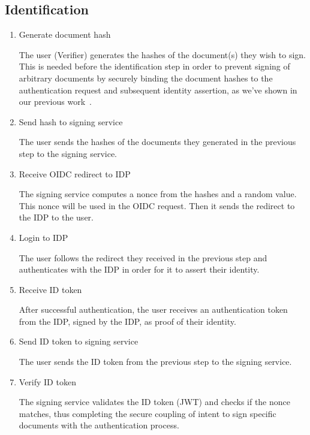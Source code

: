 \subsection{Identification}
\begin{enumerate}[resume]
	\item Generate document hash
	
	The user (Verifier) generates the hashes of the document(s) they wish to sign.
	This is needed before the identification step in order to prevent signing of arbitrary documents by securely binding the document hashes to the authentication request and subsequent identity assertion,
	as we've shown in our previous work~\cite{projekt2}.

	\item Send hash to signing service
	
	The user sends the hashes of the documents they generated in the previous step to the signing service.
	
	\item Receive \gls{OIDC} redirect to \gls{IDP}
	
	The signing service computes a nonce from the hashes and a random value.
	This nonce will be used in the \gls{OIDC} request.
	Then it sends the redirect to the \gls{IDP} to the user.
	
	\item Login to \gls{IDP}
	
	The user follows the redirect they received in the previous step and authenticates with the \gls{IDP} in order for it to assert their identity.
	
	\item Receive ID token
	
	After successful authentication, the user receives an authentication token from the \gls{IDP},
    signed by the \gls{IDP}, as proof of their identity.
	
	\item Send ID token to signing service
	
	The user sends the ID token from the previous step to the signing service.
	
	\item Verify ID token
	
	The signing service validates the ID token (\gls{JWT}) and checks if the nonce matches,
    thus completing the secure coupling of intent to sign specific documents with the authentication process.
\end{enumerate}

